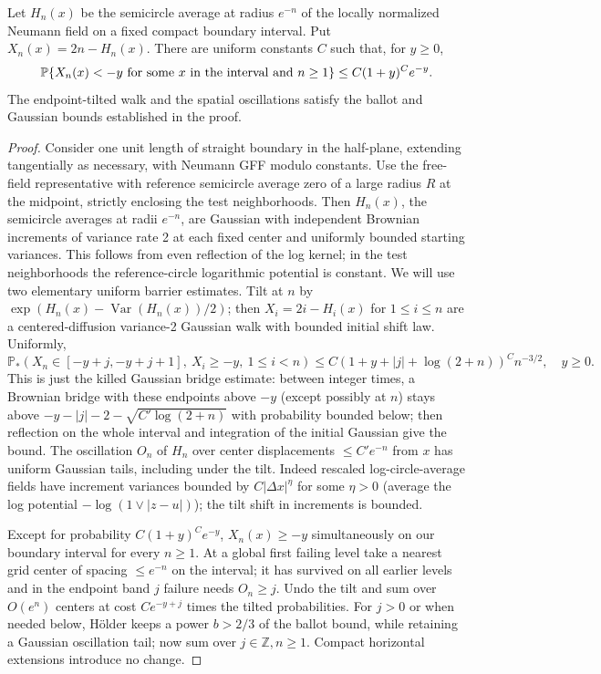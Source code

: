 \begin{lemma}\label{proxy:barrier}
Let $H_n(x)$ be the semicircle average at radius $e^{-n}$ of the locally normalized Neumann field on a fixed compact boundary interval.  Put $X_n(x)=2n-H_n(x)$.  There are uniform constants $C$ such that, for $y\geq0$,
\[
 \mathbb P\{X_n(x)<-y\text{ for some }x\text{ in the interval and }n\geq1\}
 \leq C(1+y)^C e^{-y}.
\]
The endpoint-tilted walk and the spatial oscillations satisfy the ballot and Gaussian bounds established in the proof.
\end{lemma}\begin{proof}

Consider one unit length of straight boundary in the half-plane, extending tangentially as necessary, with Neumann GFF modulo constants.
Use the free-field representative with reference semicircle average zero of a large radius \(R\) at the midpoint, strictly enclosing the test neighborhoods.
Then \(H_n(x)\), the semicircle averages at radii \(e^{-n}\), are Gaussian with independent Brownian increments of variance rate 2 at each fixed center and uniformly bounded starting variances.
This follows from even reflection of the log kernel; in the test neighborhoods the reference-circle logarithmic potential is constant.
We will use two elementary uniform barrier estimates.
Tilt at \(n\) by \(\exp(H_n(x)-\operatorname{Var}(H_n(x))/2)\); then \(X_i=2i-H_i(x)\) for \(1\le i\le n\) are a centered-diffusion variance-2 Gaussian walk with bounded initial shift law.
Uniformly,
\[
 {\mathbb P}_*(X_n\in[-y+j,-y+j+1],\ X_i\ge-y,\ 1\le i<n)
 \le C(1+y+|j|+\log(2+n))^C n^{-3/2},\quad y\ge0.
\]
This is just the killed Gaussian bridge estimate: between integer times, a Brownian bridge with these endpoints above \(-y\) (except possibly at \(n\)) stays above \(-y-|j|-2-\sqrt{C'\log(2+n)}\) with probability bounded below; then reflection on the whole interval and integration of the initial Gaussian give the bound.
The oscillation \(O_n\) of \(H_n\) over center displacements \(\le C'e^{-n}\) from \(x\) has uniform Gaussian tails, including under the tilt.
Indeed rescaled log-circle-average fields have increment variances bounded by \(C|\Delta x|^\eta\) for some \(\eta>0\) (average the log potential \(-\log(1\vee|z-u|)\)); the tilt shift in increments is bounded.

Except for probability \(C(1+y)^C e^{-y}\), \(X_n(x)\ge-y\) simultaneously on our boundary interval for every \(n\ge1\).
At a global first failing level take a nearest grid center of spacing \(\le e^{-n}\) on the interval; it has survived on all earlier levels and in the endpoint band \(j\) failure needs \(O_n\ge j\).
Undo the tilt and sum over \(O(e^n)\) centers at cost \(C e^{-y+j}\) times the tilted probabilities.
For \(j>0\) or when needed below, Hölder keeps a power \(b>2/3\) of the ballot bound, while retaining a Gaussian oscillation tail; now sum over \(j\in\mathbb Z,n\ge1\).
Compact horizontal extensions introduce no change.

\end{proof}

